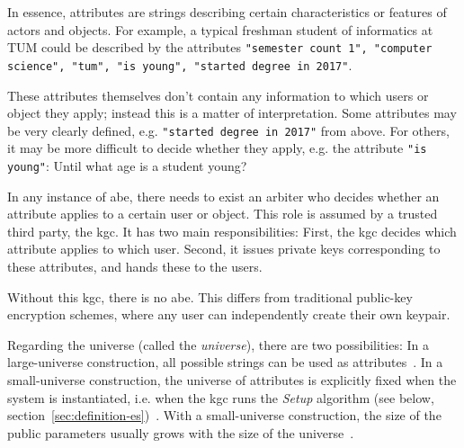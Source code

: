 \begin{figure}
{        %
    }
    \label{fig:abe-system}
\end{figure}
In essence, attributes are strings describing certain characteristics or features of actors and objects.
For example, a typical freshman student of informatics at TUM could be described by the attributes \texttt{"semester count 1", "computer science", "tum", "is young", "started degree in 2017"}.

These attributes themselves don't contain any information to which users or object they apply; instead this is a matter of interpretation.
Some attributes may be very clearly defined, e.g. \texttt{"started degree in 2017"} from above.
For others, it may be more difficult to decide whether they apply, e.g. the attribute \texttt{"is young"}: Until what age is a student young?

In any instance of \acrshort{abe}, there needs to exist an arbiter who decides whether an attribute applies to a certain user or object.
This role is assumed by a trusted third party, the \acrfull{kgc}.
It has two main responsibilities: First, the \acrshort{kgc} decides which attribute applies to which user.
Second, it issues private keys corresponding to these attributes, and hands these to the users.

Without this \acrshort{kgc}, there is no \acrshort{abe}.
This differs from traditional public-key encryption schemes, where any user can independently create their own keypair.

Regarding the \glsdesc{universe} (called the \emph{\gls{universe}}), there are two possibilities:
In a \gls{large-universe} construction, all possible strings can be used as attributes~\cite{goyal_attribute-based_2006}.
In a \gls{small-universe} construction, the universe of attributes is explicitly fixed when the system is instantiated, i.e. when the \acrshort{kgc} runs the \emph{Setup} algorithm (see below, section~\ref{sec:definition-es})~\cite{goyal_attribute-based_2006}.
With a \gls{small-universe} construction, the size of the public parameters usually grows with the size of the \gls{universe}~\cite{goyal_attribute-based_2006}.

